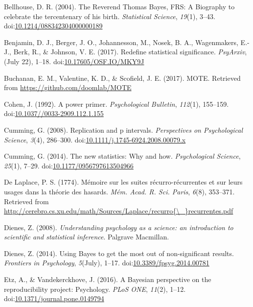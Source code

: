 \documentclass[english,man]{apa6}
\theoremstyle{definition}
\theoremstyle{definition}
\theoremstyle{definition}
\theoremstyle{remark}
\begin{document}
\hypertarget{ref-Bellhouse2004}{}
Bellhouse, D. R. (2004). The Reverend Thomas Bayes, FRS: A Biography to
celebrate the tercentenary of his birth. \emph{Statistical Science},
\emph{19}(1), 3--43.
doi:\href{https://doi.org/10.1214/088342304000000189}{10.1214/088342304000000189}

\hypertarget{ref-Benjamin2017}{}
Benjamin, D. J., Berger, J. O., Johannesson, M., Nosek, B. A.,
Wagenmakers, E.-J., Berk, R., \& Johnson, V. E. (2017). Redefine
statistical significance. \emph{PsyArxiv}, (July 22), 1--18.
doi:\href{https://doi.org/10.17605/OSF.IO/MKY9J}{10.17605/OSF.IO/MKY9J}

\hypertarget{ref-Buchanan2017}{}
Buchanan, E. M., Valentine, K. D., \& Scofield, J. E. (2017). MOTE.
Retrieved from \url{https://github.com/doomlab/MOTE}

\hypertarget{ref-Cohen1992a}{}
Cohen, J. (1992). A power primer. \emph{Psychological Bulletin},
\emph{112}(1), 155--159.
doi:\href{https://doi.org/10.1037//0033-2909.112.1.155}{10.1037//0033-2909.112.1.155}

\hypertarget{ref-Cumming2008}{}
Cumming, G. (2008). Replication and p intervals. \emph{Perspectives on
Psychological Science}, \emph{3}(4), 286--300.
doi:\href{https://doi.org/10.1111/j.1745-6924.2008.00079.x}{10.1111/j.1745-6924.2008.00079.x}

\hypertarget{ref-Cumming2014}{}
Cumming, G. (2014). The new statistics: Why and how. \emph{Psychological
Science}, \emph{25}(1), 7--29.
doi:\href{https://doi.org/10.1177/0956797613504966}{10.1177/0956797613504966}

\hypertarget{ref-DeLaplace1774}{}
De Laplace, P. S. (1774). Mémoire sur les suites récurro-récurrentes et
sur leurs usages dans la théorie des hasards. \emph{Mém. Acad. R. Sci.
Paris}, \emph{6}(8), 353--371. Retrieved from
\href{http://cerebro.cs.xu.edu/math/Sources/Laplace/recurro\%7B/_\%7Drecurrentes.pdf}{http://cerebro.cs.xu.edu/math/Sources/Laplace/recurro\{\textbackslash{}\_\}recurrentes.pdf}

\hypertarget{ref-Dienes2008}{}
Dienes, Z. (2008). \emph{Understanding psychology as a science: an
introduction to scientific and statistical inference}. Palgrave
Macmillan.

\hypertarget{ref-Dienes2014}{}
Dienes, Z. (2014). Using Bayes to get the most out of non-significant
results. \emph{Frontiers in Psychology}, \emph{5}(July), 1--17.
doi:\href{https://doi.org/10.3389/fpsyg.2014.00781}{10.3389/fpsyg.2014.00781}

\hypertarget{ref-Etz2016}{}
Etz, A., \& Vandekerckhove, J. (2016). A Bayesian perspective on the
reproducibility project: Psychology. \emph{PLoS ONE}, \emph{11}(2),
1--12.
doi:\href{https://doi.org/10.1371/journal.pone.0149794}{10.1371/journal.pone.0149794}
\end{document}
